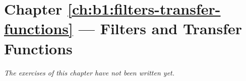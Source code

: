 \section*{Chapter \ref{ch:b1:filters-transfer-functions} --- Filters and Transfer Functions}


\emph{The exercises of this chapter have not been written yet.}
